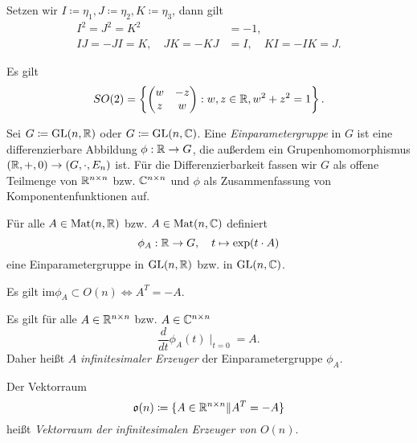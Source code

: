 \documentclass{cheat-sheet}
\newcommand{\GL}{\mathrm{GL}}
\newcommand{\Mat}{\mathrm{Mat}}
\newcommand{\im}{\mathrm{im}}
\begin{document}
\begin{defn}
Setzen wir $I \coloneqq \eta_1, J \coloneqq \eta_2, K \coloneqq \eta_3$, dann gilt
\begin{align*}
I^2 = J^2 = K^2 &= -1, \\
IJ = -JI = K, \quad JK = -KJ &= I, \quad KI = -IK = J.
\end{align*}
\end{defn}

\begin{satz}
Es gilt
\[ SO(2) = \left\{ \begin{pmatrix} w & -z \\ z & w \end{pmatrix} : w, z \in \mathbb{R}, w^2 + z^2 = 1 \right\}. \]
\end{satz}


\begin{defn}
Sei $G \coloneqq \GL(n, \R)$ oder $G \coloneqq \GL(n, \C)$. Eine \emph{Einparametergruppe} in $G$ ist eine differenzierbare Abbildung $\phi : \mathbb{R} \to G$, die außerdem ein Grupenhomomorphismus $(\mathbb{R}, +, 0) \to (G, \cdot, E_n)$ ist. Für die Differenzierbarkeit fassen wir $G$ als offene Teilmenge von $\mathbb{R}^{n \times n}$ bzw. $\mathbb{C}^{n \times n}$ und $\phi$ als Zusammenfassung von Komponentenfunktionen auf.
\end{defn}

\begin{satz}
Für alle $A \in \Mat(n, \R)$ bzw. $A \in \Mat(n, \C)$ definiert
\[ \phi_A : \mathbb{R} \to G, \quad t \mapsto \exp(t \cdot A) \]
eine Einparametergruppe in $\GL(n, \R)$ bzw. in $\GL(n, \C)$.
\end{satz}

\begin{satz}
Es gilt $\im \phi_A \subset O(n) \iff A^T = -A$.
\end{satz}

\begin{bem}
Es gilt für alle $A \in \mathbb{R}^{n \times n}$ bzw. $A \in \mathbb{C}^{n \times n}$
\[ \frac{d}{dt} \phi_A(t) \mid_{t=0} = A. \]
Daher heißt $A$ \emph{infinitesimaler Erzeuger} der Einparametergruppe $\phi_A$.
\end{bem}

\begin{defn}
Der Vektorraum
\[ \mathfrak{o}(n) \coloneqq \{ A \in \mathbb{R}^{n \times n} \| A^T = - A \} \]
heißt \emph{Vektorraum der infinitesimalen Erzeuger von $O(n)$}.
\end{defn}
\end{document}
